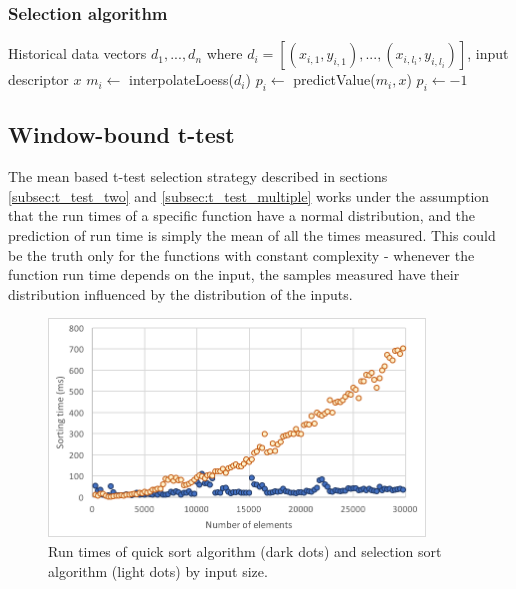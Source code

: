 \subsubsection{Selection algorithm}

\begin{algorithmic}[1] %
	\INPUT Historical data vectors $d_1,...,d_n$ where $d_i = [(x_{i,1}, y_{i,1}),...,(x_{i,l_i}, y_{i,l_i})]$, input descriptor $x$
	\State $m_i \gets$ interpolateLoess($d_i$)
	\State $p_i \gets$ predictValue($m_i, x$)
	\State$p_i \gets -1$
	\EndIf
	\EndFor
	\State{}
\end{algorithmic}

\subsection{Window-bound t-test}
\label{subsec:window_bound_t_test}

The mean based t-test selection strategy described in sections \ref{subsec:t_test_two} and \ref{subsec:t_test_multiple} works under the assumption that the run times of a specific function have a normal distribution, and the prediction of run time is simply the mean of all the times measured. This could be the truth only for the functions with constant complexity - whenever the function run time depends on the input, the samples measured have their distribution influenced by the distribution of the inputs.

\begin{figure}[h!]
	\captionsetup{justification=centering,margin=0.5cm}
	\centerline{\mbox{\includegraphics[width=100mm]{./img/quick_vs_selection.png}}}
	\caption{Run times of quick sort algorithm (dark dots) and selection sort algorithm (light dots) by input size.}
	\label{fig:quick_vs_selection}
\end{figure}


